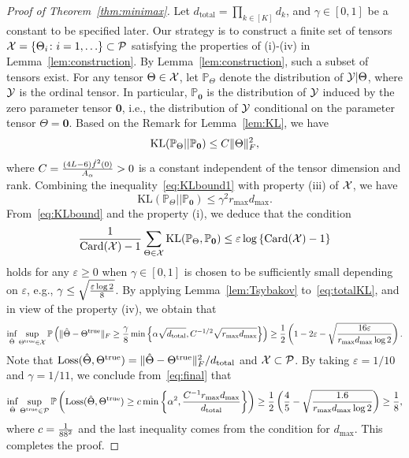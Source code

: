 \documentclass{article}
\theoremstyle{plain}
\theoremstyle{definition}
\begin{document}
\begin{proof}[Proof of Theorem~\ref{thm:minimax}]

Let $d_{\text{total}}=\prod_{k\in[K]}d_k$, and $\gamma\in[0,1]$ be a constant to be specified later.  Our strategy is to construct a finite set of tensors $\mathcal{X}=\{\Theta_i\colon i=1,\ldots \}\subset \mathcal{P}$ satisfying the properties of (i)-(iv) in Lemma~\ref{lem:construction}. By Lemma~\ref{lem:construction}, such a subset of tensors exist. For any tensor  $\Theta\in\mathcal{X}$, let $\mathbb{P}_{\Theta}$ denote the distribution of $\mathcal{Y}|\Theta$, where $\mathcal{Y}$ is the ordinal tensor. In particular, $\mathbb{P}_{\mathbf{0}}$ is the distribution of $\mathcal{Y}$ induced by the zero parameter tensor $\mathbf{0}$, i.e., the distribution of $\mathcal{Y}$ conditional on the parameter tensor $\Theta=\mathbf{0}$. Based on the Remark for Lemma~\ref{lem:KL}, we have
\begin{equation}\label{eq:KLbound1}
\mathrm{KL}(\mathbb{P}_{\Theta}|| \mathbb{P}_{\mathbf{0}})\leq C \lVert\Theta\rVert_F^2,
\end{equation}
where $C={(4L-6) \dot{f}^2(0)\over  A_\alpha}>0$ is a constant independent of the tensor dimension and rank.
Combining the inequality~\eqref{eq:KLbound1} with property (iii) of $\mathcal{X}$, we have
\begin{equation}\label{eq:KLbound}
\text{KL}(\mathbb{P}_{\Theta}||\mathbb{P}_{\mathbf{0}})\leq \gamma^2 r_{\max} d_{\max}.
\end{equation}
From~\eqref{eq:KLbound} and the property (i), we deduce that the condition
\begin{equation}\label{eq:totalKL}
{1\over \text{Card}(\mathcal{X})-1}\sum_{\Theta \in\mathcal{X}}\text{KL}(\mathbb{P}_{\Theta}, \mathbb{P}_{\mathbf{0}})\leq \varepsilon \log\left\{\text{Card}(\mathcal{X})-1 \right\}
\end{equation}
holds for any $ \varepsilon \geq 0$ when $\gamma\in[0,1]$ is chosen to be sufficiently small depending on $\varepsilon$, e.g., $\gamma \leq \sqrt{\varepsilon\log2\over8}$. By applying Lemma~\ref{lem:Tsybakov} to~\eqref{eq:totalKL}, and in view of the property (iv), we obtain that
\begin{equation}\label{eq:final}
\inf_{\hat \Theta}\sup_{\Theta^{\mathrm{true}}\in \mathcal{X}}\mathbb{P}\left(\lVert\hat \Theta- \Theta^{\mathrm{true}}\rVert_F\geq  {\gamma\over 8} \min\left\{ \alpha\sqrt{d_{\text{total}}}, C^{-1/2}\sqrt{ r_{\max}d_{\max}}\right\} \right)\geq {1\over 2}\left(1-2\varepsilon-\sqrt{16 \varepsilon \over r_{\max}d_{\max}\log2}\right).
\end{equation}
Note that $\text{Loss}(\hat \Theta, \Theta^{\mathrm{true}})=\lVert\hat \Theta- \Theta^{\mathrm{true}}\rVert_F^2/d_{\text{total}}$ and $\mathcal{X}\subset \mathcal{P}$. By taking $\varepsilon=1/10$ and $\gamma=1/11$, we conclude from~\eqref{eq:final} that
\begin{equation}\label{eq:prob}
\inf_{\hat \Theta}\sup_{\Theta^{\mathrm{true}}\in \mathcal{P}}\mathbb{P}\left(\text{Loss}(\hat \Theta, \Theta^{\mathrm{true}})\geq c\min\left \{ \alpha^2,  {C^{-1}r_{\max}d_{\max}\over d_{\text{total}}}\right \}\right)\geq {1\over 2}\left({4\over 5}- \sqrt{1.6\over r_{\max}d_{\max}\log2} \right)\geq {1\over 8},
\end{equation}
where $c = {1 \over 88^2}$ and the last inequality comes from the condition for $d_{\text{max}}$.
This completes the proof.
\end{proof}
\end{document}

